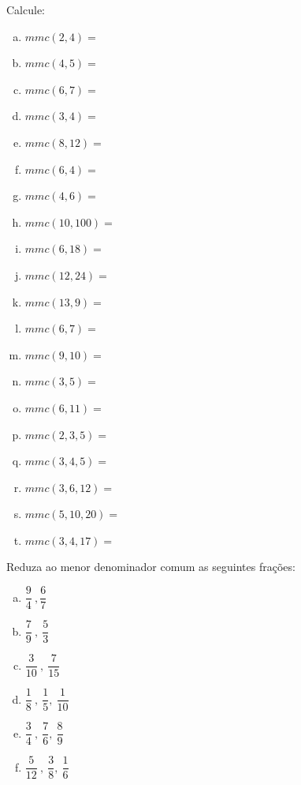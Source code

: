\item Calcule:
\begin{multicols}{4}
\begin{enumerate}[a)]
	\item $mmc(2,4)=$
	\item $mmc(4,5)=$
	\item $mmc(6,7)=$
	\item $mmc(3,4)=$
	\item $mmc(8,12)=$

	\item $mmc(6 ,4 )=$
	\item $mmc(4,6)=$
	\item $mmc(10,100 )=$
	\item $mmc(6,18)=$
	\item $mmc(12,24)=$

	\item $mmc(13,9)=$
	\item $mmc(6,7)=$
	\item $mmc(9,10)=$
	\item $mmc(3,5)=$
	\item $mmc(6,11)=$

	\item $mmc(2,3,5)=$
	\item $mmc(3,4,5)=$
	\item $mmc(3,6,12)=$
	\item $mmc(5,10,20)=$
	\item $mmc(3,4,17)=$

\end{enumerate}
\end{multicols}

\item Reduza ao menor denominador comum as seguintes frações:
\begin{multicols}{3}
\begin{enumerate}[a)]
	\item $\dfrac{9}{4}\ , \dfrac{6}{7}$
	\item $\dfrac{7}{9}\ ,\ \dfrac{5}{3}$
	\item $\dfrac{3}{10}\ ,\ \dfrac{7}{15}$

	\item $\dfrac{1}{8}\ ,\ \dfrac{1}{5},\ \dfrac{1}{10}$
	\item $\dfrac{3}{4}\ ,\ \dfrac{7}{6},\ \dfrac{8}{9}$
	\item $\dfrac{5}{12}\ ,\ \dfrac{3}{8},\ \dfrac{1}{6}$
\end{enumerate}
\end{multicols}

